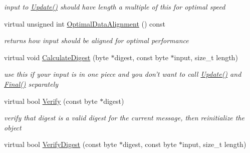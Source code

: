 \begin{DoxyCompactItemize}
\begin{DoxyCompactList}\small\item\em input to \hyperlink{class_hash_transformation_aafabefaf445b65d3ba0d8e1c0294afe5}{Update()} should have length a multiple of this for optimal speed \item\end{DoxyCompactList}\item 
\hypertarget{class_hash_transformation_a81f46e4ca555b073d30f14a3b3f8ad79}{
virtual unsigned int \hyperlink{class_hash_transformation_a81f46e4ca555b073d30f14a3b3f8ad79}{OptimalDataAlignment} () const }
\label{class_hash_transformation_a81f46e4ca555b073d30f14a3b3f8ad79}

\begin{DoxyCompactList}\small\item\em returns how input should be aligned for optimal performance \item\end{DoxyCompactList}\item 
\hypertarget{class_hash_transformation_af8124c4fca23b74bbdc43660bdae692c}{
virtual void \hyperlink{class_hash_transformation_af8124c4fca23b74bbdc43660bdae692c}{CalculateDigest} (byte $\ast$digest, const byte $\ast$input, size\_\-t length)}
\label{class_hash_transformation_af8124c4fca23b74bbdc43660bdae692c}

\begin{DoxyCompactList}\small\item\em use this if your input is in one piece and you don't want to call \hyperlink{class_hash_transformation_aafabefaf445b65d3ba0d8e1c0294afe5}{Update()} and \hyperlink{class_hash_transformation_aa0b8c7a110d8968268fd02ec32b9a8e8}{Final()} separately \item\end{DoxyCompactList}\item 
virtual bool \hyperlink{class_hash_transformation_a16c4aecd047015d513feef4ed5b929ba}{Verify} (const byte $\ast$digest)
\begin{DoxyCompactList}\small\item\em verify that digest is a valid digest for the current message, then reinitialize the object \item\end{DoxyCompactList}\item 
\hypertarget{class_hash_transformation_acad96df68e70d922683e5063057130b2}{
virtual bool \hyperlink{class_hash_transformation_acad96df68e70d922683e5063057130b2}{VerifyDigest} (const byte $\ast$digest, const byte $\ast$input, size\_\-t length)}
\label{class_hash_transformation_acad96df68e70d922683e5063057130b2}


\end{DoxyCompactItemize}
